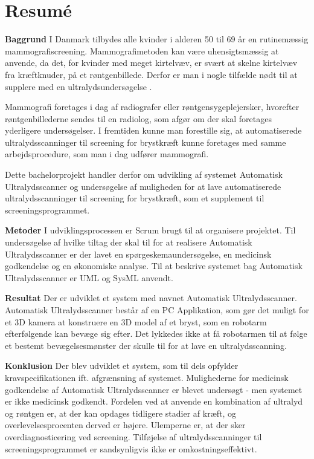 \chapter{Resumé}
\textbf{Baggrund}
I Danmark tilbydes alle kvinder i alderen 50 til 69 år en rutinemæssig mammografiscreening. Mammografimetoden kan være uhensigtsmæssig at anvende, da det, for kvinder med meget kirtelvæv, er svært at skelne kirtelvæv fra kræftknuder, på et røntgenbillede. Derfor er man i nogle tilfælde nødt til at supplere med en ultralydsundersøgelse \cite{Ultralyd}.

Mammografi foretages i dag af radiografer eller røntgensygeplejersker, hvorefter røntgenbillederne sendes til en radiolog, som afgør om der skal foretages yderligere undersøgelser. I fremtiden kunne man forestille sig, at automatiserede ultralydsscanninger til screening for brystkræft kunne foretages med samme arbejdsprocedure, som man i dag udfører mammografi.

Dette bachelorprojekt handler derfor om udvikling af systemet Automatisk Ultralydsscanner og undersøgelse af muligheden for at lave automatiserede ultralydsscanninger til screening for brystkræft, som et supplement til screeningsprogrammet.

\textbf{Metoder}
I udviklingsprocessen er Scrum brugt til at organisere projektet. Til undersøgelse af hvilke tiltag der skal til for at realisere Automatisk Ultralydsscanner er der lavet en spørgeskemaundersøgelse, en medicinsk godkendelse og en økonomiske analyse. Til at beskrive systemet bag Automatisk Ultralydsscanner er UML og SysML anvendt. 

\textbf{Resultat}
Der er udviklet et system med navnet Automatisk Ultralydsscanner. Automatisk Ultralydsscanner består af en PC Applikation, som gør det muligt for et 3D kamera at konstruere en 3D model af et bryst, som en robotarm efterfølgende kan bevæge sig efter. Det lykkedes ikke at få robotarmen til at følge et bestemt bevægelsesmønster der skulle til for at lave en ultralydsscanning. 

\textbf{Konklusion}
Der blev udviklet et system, som til dels opfylder kravspecifikationen ift. afgrænsning af systemet. Mulighederne for medicinsk godkendelse af Automatisk Ultralydsscanner er blevet undersøgt - men systemet er ikke medicinsk godkendt. Fordelen ved at anvende en kombination af ultralyd og røntgen er, at der kan opdages tidligere stadier af kræft, og overlevelsesprocenten derved er højere. Ulemperne er, at der sker overdiagnosticering ved screening. Tilføjelse af ultralydsscanninger til screeningsprogrammet er sandsynligvis ikke er omkostningseffektivt.